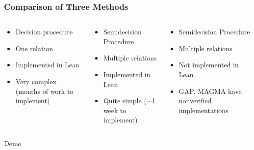 \documentclass{beamer}
\begin{document}
\begin{frame}[t]
  \frametitle{Comparison of Three Methods}
  \begin{columns}
    \begin{column}{0.33\textwidth}
      \begin{itemize}
        \item Decision procedure
        \item One relation
        \item Implemented in Lean
        \item Very complex (months of work to implement)
      \end{itemize}
    \end{column}
    \begin{column}{0.33\textwidth}
      \begin{itemize}
        \item Semidecision Procedure
        \item Multiple relations
        \item Implemented in Lean
        \item Quite simple ($\sim$1 week to implement)
      \end{itemize}
    \end{column}
    \begin{column}{0.33\textwidth}
      \begin{itemize}
        \item Semidecision Procedure
        \item Multiple relations
        \item Not implemented in Lean
        \item GAP, MAGMA have nonverified implementations
      \end{itemize}
    \end{column}
  \end{columns}
\end{frame}

\begin{frame}
  Demo
\end{frame}


\end{document}
